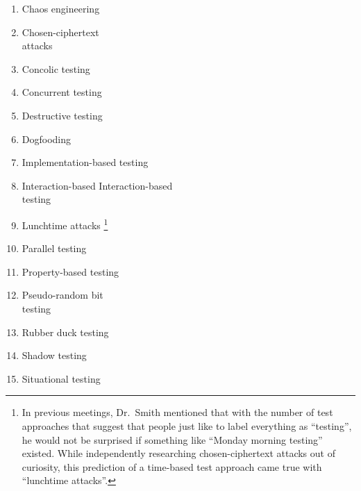 \begin{minipage}{\linewidth}
    \begin{multicols}{2}
        \begin{enumerate}
            \item Chaos engineering
            \item Chosen-ciphertext \ifnotpaper\else \\ \fi attacks
            \item Concolic testing
            \item Concurrent testing
            \item Destructive testing
            \item Dogfooding
            \item Implementation-based testing
            \item \ifnotpaper Interaction-based \else \columnbreak
                      Interaction-based \\ \fi testing
            \item Lunchtime attacks\ifnotpaper%
                      \footnote{In previous meetings, Dr.~Smith mentioned
                          that with the number of test approaches that suggest
                          that people just like to label everything as
                          ``testing'', he would not be surprised if something
                          like ``Monday morning testing'' existed. While
                          independently researching chosen-ciphertext attacks
                          out of curiosity, this prediction of a time-based
                          test approach came true with ``lunchtime attacks''.}
                  \fi
            \item Parallel testing
            \item Property-based testing
            \item Pseudo-random bit \ifnotpaper\else \\ \fi testing
            \item Rubber duck testing
            \item Shadow testing
            \item Situational testing
        \end{enumerate}
    \end{multicols}
\end{minipage}

